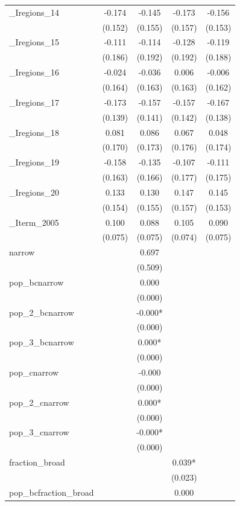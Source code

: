 \documentclass[]{article}
\begin{document}
\begin{tabular}{lcccc}
\_Iregions\_14 & -0.174 & -0.145 & -0.173 & -0.156 \\
 & (0.152) & (0.155) & (0.157) & (0.153) \\
\_Iregions\_15 & -0.111 & -0.114 & -0.128 & -0.119 \\
 & (0.186) & (0.192) & (0.192) & (0.188) \\
\_Iregions\_16 & -0.024 & -0.036 & 0.006 & -0.006 \\
 & (0.164) & (0.163) & (0.163) & (0.162) \\
\_Iregions\_17 & -0.173 & -0.157 & -0.157 & -0.167 \\
 & (0.139) & (0.141) & (0.142) & (0.138) \\
\_Iregions\_18 & 0.081 & 0.086 & 0.067 & 0.048 \\
 & (0.170) & (0.173) & (0.176) & (0.174) \\
\_Iregions\_19 & -0.158 & -0.135 & -0.107 & -0.111 \\
 & (0.163) & (0.166) & (0.177) & (0.175) \\
\_Iregions\_20 & 0.133 & 0.130 & 0.147 & 0.145 \\
 & (0.154) & (0.155) & (0.157) & (0.153) \\
\_Iterm\_2005 & 0.100 & 0.088 & 0.105 & 0.090 \\
 & (0.075) & (0.075) & (0.074) & (0.075) \\
narrow &  & 0.697 &  &  \\
 &  & (0.509) &  &  \\
pop\_bcnarrow &  & 0.000 &  &  \\
 &  & (0.000) &  &  \\
pop\_2\_bcnarrow &  & -0.000* &  &  \\
 &  & (0.000) &  &  \\
pop\_3\_bcnarrow &  & 0.000* &  &  \\
 &  & (0.000) &  &  \\
pop\_cnarrow &  & -0.000 &  &  \\
 &  & (0.000) &  &  \\
pop\_2\_cnarrow &  & 0.000* &  &  \\
 &  & (0.000) &  &  \\
pop\_3\_cnarrow &  & -0.000* &  &  \\
 &  & (0.000) &  &  \\
fraction\_broad &  &  & 0.039* &  \\
 &  &  & (0.023) &  \\
pop\_bcfraction\_broad &  &  & 0.000 &  \\

\end{tabular}
\end{document}
